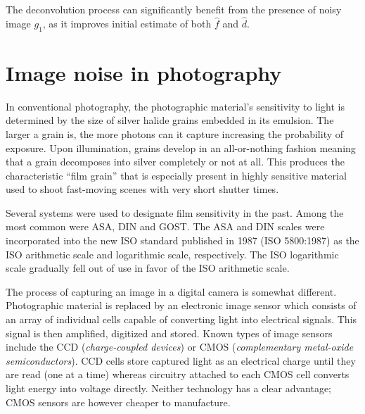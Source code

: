 \documentclass[12pt,notitlepage]{report}
\begin{document}
The deconvolution process can significantly benefit from the presence of noisy image $g_1$, as it improves initial estimate of both $\hat{f}$ and $\hat{d}$.   


\section{Image noise in photography}
\label{sec:image_noise_in_photography}

In conventional photography, the photographic material’s sensitivity to light is determined by the size of silver halide grains embedded in its emulsion. The larger a grain is, the more photons can it capture increasing the probability of exposure. Upon illumination, grains develop in an all-or-nothing fashion meaning that a grain decomposes into silver completely or not at all.  This produces the characteristic “film grain” that is especially present in highly sensitive material used to shoot fast-moving scenes with very short shutter times. 

Several systems were used to designate film sensitivity in the past. Among the most common were ASA, DIN and GOST. The ASA and DIN scales were incorporated into the new ISO standard published in 1987 (ISO 5800:1987) as the ISO arithmetic scale and logarithmic scale, respectively. The ISO logarithmic scale gradually fell out of use in favor of the ISO arithmetic scale.

The process of capturing an image in a digital camera is somewhat different. Photographic material is replaced by an electronic image sensor which consists of an array of individual cells capable of converting light into electrical signals. This signal is then amplified, digitized and stored. Known types of image sensors include the CCD ({\em charge-coupled devices}) or CMOS ({\em complementary metal-oxide semiconductors}). CCD cells store captured light as an electrical charge until they are read (one at a time) whereas circuitry attached to each CMOS cell converts light energy into voltage directly. Neither technology has a clear advantage; CMOS sensors are however cheaper to manufacture.
\end{document}
